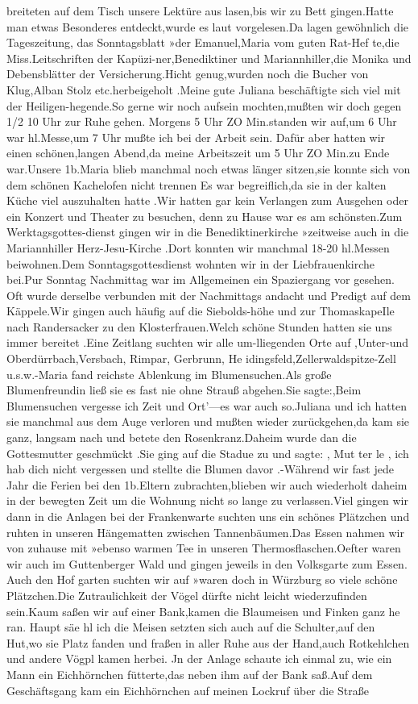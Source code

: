 \documentclass[a4paper,11pt]{article}
\begin{document}
breiteten auf dem Tisch unsere Lektüre aus lasen,bis wir zu Bett gingen.Hatte man etwas Besonderes entdeckt,wurde es laut vorgelesen.Da lagen gewöhnlich die Tageszeitung, das Sonntagsblatt »der Emanuel,Maria vom guten Rat-Hef te,die Miss.Leitschriften der Kapüzi-ner,Benediktiner und Mariannhiller,die Monika und Debensblätter der Versicherung.Hicht genug,wurden noch die Bucher von Klug,Alban Stolz etc.herbeigeholt .Meine gute Juliana beschäftigte sich viel mit der Heiligen-hegende.So gerne wir noch aufsein mochten,mußten wir doch gegen 1/2 10 Uhr zur Ruhe gehen. Morgens 5 Uhr ZO Min.standen wir auf,um 6 Uhr war hl.Messe,um 7 Uhr mußte ich bei der Arbeit sein. Dafür aber hatten wir einen schönen,langen Abend,da meine Arbeitszeit um 5 Uhr ZO Min.zu Ende war.Unsere 1b.Maria blieb manchmal noch etwas länger sitzen,sie konnte sich von dem schönen Kachelofen nicht trennen Es war begreiflich,da sie in der kalten Küche viel auszuhalten hatte .Wir hatten gar kein Verlangen zum Ausgehen oder ein Konzert und Theater zu besuchen, denn zu Hause war es am schönsten.Zum Werktagsgottes-dienst gingen wir in die Benediktinerkirche »zeitweise auch in die Mariannhiller Herz-Jesu-Kirche .Dort konnten wir manchmal 18-20 hl.Messen beiwohnen.Dem Sonntagsgottesdienst wohnten wir in der Liebfrauenkirche bei.Pur Sonntag Nachmittag war im Allgemeinen ein Spaziergang vor gesehen. Oft wurde derselbe verbunden mit der Nachmittags andacht und Predigt auf dem Käppele.Wir gingen auch häufig auf die Siebolds-höhe und zur ThomaskapeIle nach Randersacker zu den Klosterfrauen.Welch schöne Stunden hatten sie uns immer bereitet .Eine Zeitlang suchten wir alle um-lliegenden Orte auf ,Unter-und Oberdürrbach,Versbach, Rimpar, Gerbrunn, He idingsfeld,Zellerwaldspitze-Zell u.s.w.-Maria fand reichste Ablenkung im Blumensuchen.Als große Blumenfreundin ließ sie es fast nie ohne Strauß abgehen.Sie sagte:,Beim Blumensuchen vergesse ich Zeit und Ort'—es war auch so.Juliana und ich hatten sie manchmal aus dem Auge verloren und mußten wieder zurückgehen,da kam sie ganz, langsam nach und betete den Rosenkranz.Daheim wurde dan die Gottesmutter geschmückt .Sie ging auf die Stadue zu und sagte: , Mut ter le , ich hab dich nicht vergessen und stellte die Blumen davor .-Während wir fast jede Jahr die Ferien bei den 1b.Eltern zubrachten,blieben wir auch wiederholt daheim in der bewegten Zeit um die Wohnung nicht so lange zu verlassen.Viel gingen wir dann in die Anlagen bei der Frankenwarte suchten uns ein schönes Plätzchen und ruhten in unseren Hängematten zwischen Tannenbäumen.Das Essen nahmen wir von zuhause mit »ebenso warmen Tee in unseren Thermosflaschen.Oefter waren wir auch im Guttenberger Wald und gingen jeweils in den Volksgarte zum Essen. Auch den Hof garten suchten wir auf »waren doch in Würzburg so viele schöne Plätzchen.Die Zutraulichkeit der Vögel dürfte nicht leicht wiederzufinden sein.Kaum saßen wir auf einer Bank,kamen die Blaumeisen und Finken ganz he ran. Haupt säe hl ich die Meisen setzten sich auch auf die Schulter,auf den Hut,wo sie Platz fanden und fraßen in aller Ruhe aus der Hand,auch Rotkehlchen und andere Vögpl kamen herbei. Jn der Anlage schaute ich einmal zu, wie ein Mann ein Eichhörnchen fütterte,das neben ihm auf der Bank saß.Auf dem Geschäftsgang kam ein Eichhörnchen auf meinen Lockruf über die Straße 
\end{document}
